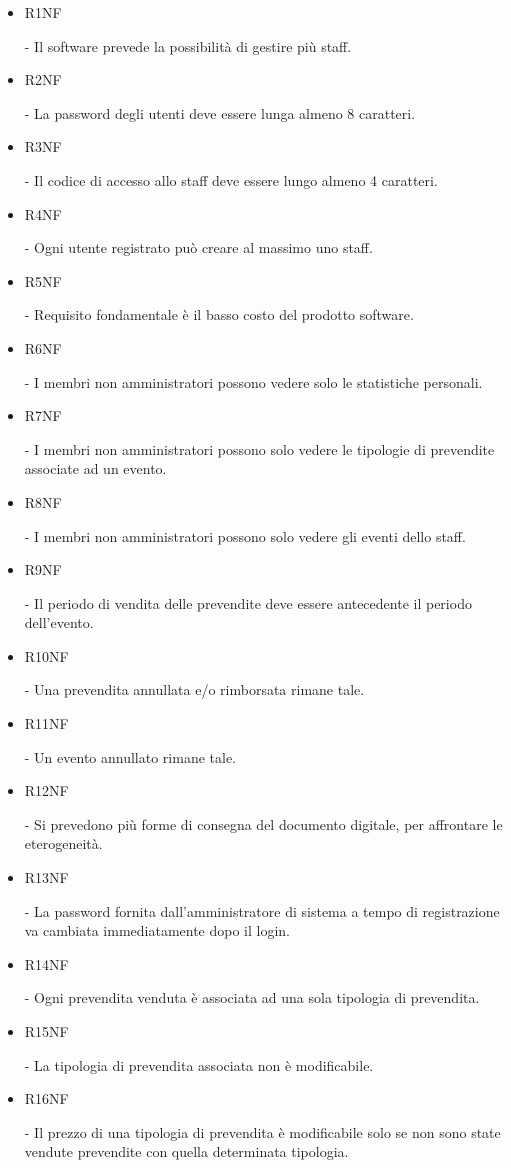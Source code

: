 \documentclass[a4paper]{article}
\begin{document}
\begin{itemize}
    \item \hypertarget{R1NF}{R1NF} - Il software prevede la possibilità di gestire più staff.
    \item \hypertarget{R2NF}{R2NF} - La password degli utenti deve essere lunga almeno 8 caratteri.
	\item \hypertarget{R3NF}{R3NF} - Il codice di accesso allo staff deve essere lungo almeno 4 caratteri.
	\item \hypertarget{R4NF}{R4NF} - Ogni utente registrato può creare al massimo uno staff.
	\item \hypertarget{R5NF}{R5NF} - Requisito fondamentale è il basso costo del prodotto software.
	
	\item \hypertarget{R6NF}{R6NF} - I membri non amministratori possono vedere solo le statistiche personali.	
	\item \hypertarget{R7NF}{R7NF} - I membri non amministratori possono solo vedere le tipologie di prevendite associate ad un evento.
	\item \hypertarget{R8NF}{R8NF} - I membri non amministratori possono solo vedere gli eventi dello staff.
	\item \hypertarget{R9NF}{R9NF} - Il periodo di vendita delle prevendite deve essere antecedente il periodo dell'evento.
	\item \hypertarget{R10NF}{R10NF} - Una prevendita annullata e/o rimborsata rimane tale.
	\item \hypertarget{R11NF}{R11NF} - Un evento annullato rimane tale.
	\item \hypertarget{R12NF}{R12NF} - Si prevedono più forme di consegna del documento digitale, per affrontare le eterogeneità.
	\item \hypertarget{R13NF}{R13NF} - La password fornita dall'amministratore di sistema a tempo di registrazione va cambiata immediatamente dopo il login.
	
	\item \hypertarget{R14NF}{R14NF} - Ogni prevendita venduta è associata ad una sola tipologia di prevendita.
	\item \hypertarget{R15NF}{R15NF} - La tipologia di prevendita associata non è modificabile.
	
	\item \hypertarget{R16NF}{R16NF} - Il prezzo di una tipologia di prevendita è modificabile solo se non sono state vendute prevendite con quella determinata tipologia.
	

\end{itemize}
\end{document}
